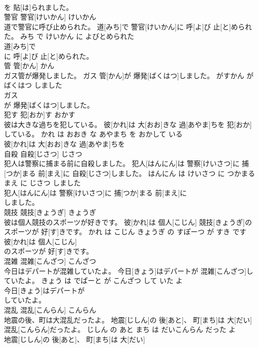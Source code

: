 \documentclass[8pt]{extreport}
\begin{document}
\begin{CJK}{UTF8}{min}
\\	を 貼[は]られました。			
\\	警官	警官[けいかん]	けいかん	
\\	道で警官に呼び止められた。	道[みち]で 警官[けいかん]に 呼[よ]び 止[と]められた。	みち で けいかん に よびとめられた	
\\	道[みち]で
\\	に 呼[よ]び 止[と]められた。			
\\	管	管[かん]	かん	
\\	ガス管が爆発しました。	ガス 管[かん]が 爆発[ばくはつ]しました。	がすかん が ばくはつ しました	
\\	ガス
\\	が 爆発[ばくはつ]しました。			
\\	犯す	犯[おか]す	おかす	
\\	彼は大きな過ちを犯している。	彼[かれ]は 大[おお]きな 過[あやま]ちを 犯[おか]している。	かれ は おおき な あやまち を おかして いる	
\\	彼[かれ]は 大[おお]きな 過[あやま]ちを
\\	自殺	自殺[じさつ]	じさつ	
\\	犯人は警察に捕まる前に自殺しました。	犯人[はんにん]は 警察[けいさつ]に 捕[つか]まる 前[まえ]に 自殺[じさつ]しました。	はんにん は けいさつ に つかまる まえ に じさつ しました	
\\	犯人[はんにん]は 警察[けいさつ]に 捕[つか]まる 前[まえ]に
\\	しました。			
\\	競技	競技[きょうぎ]	きょうぎ	
\\	彼は個人競技のスポーツが好きです。	彼[かれ]は 個人[こじん] 競技[きょうぎ]のスポーツが 好[す]きです。	かれ は こじん きょうぎ の すぽーつ が すき です	
\\	彼[かれ]は 個人[こじん]
\\	のスポーツが 好[す]きです。			
\\	混雑	混雑[こんざつ]	こんざつ	
\\	今日はデパートが混雑していたよ。	今日[きょう]はデパートが 混雑[こんざつ]していたよ。	きょう は でぱーと が こんざつ して いた よ	
\\	今日[きょう]はデパートが
\\	していたよ。			
\\	混乱	混乱[こんらん]	こんらん	
\\	地震の後、町は大混乱だったよ。	地震[じしん]の 後[あと]、 町[まち]は 大[だい] 混乱[こんらん]だったよ。	じしん の あと まち は だいこんらん だった よ	
\\	地震[じしん]の 後[あと]、 町[まち]は 大[だい]

\end{CJK}
\end{document}
